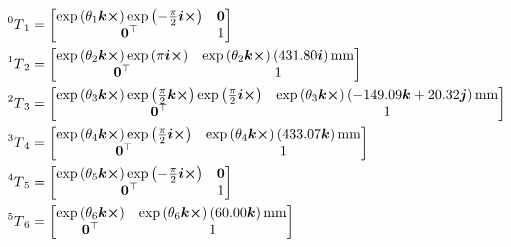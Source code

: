 \documentclass[a4paper]{scrartcl}
\begin{document}
\begin{equation}\label{eq:5transf}
     \begin{aligned}
        \prescript{0}{}{T}_1 &= \begin{bmatrix}
            \exp\left(\theta_1 \bm{k}\cross\right)\exp\left(-\tfrac{\pi}{2}\bm{i}\cross\right) & \bm{0} \\ \bm{0}^\top & 1
        \end{bmatrix} \\
        \prescript{1}{}{T}_2 &= \begin{bmatrix}
            \exp\left(\theta_2 \bm{k}\cross\right)\exp\left(\pi\bm{i}\cross\right) & \exp\left(\theta_2 \bm{k}\cross\right)\left(431.80 \bm{i} \right)\si{\mm} \\ \bm{0}^\top & 1
        \end{bmatrix}\\
        \prescript{2}{}{T}_3 &= \begin{bmatrix}
             \exp\left(\theta_3 \bm{k}\cross\right) \exp\left(\tfrac{\pi}{2}\bm{k}\cross\right)\exp\left(\tfrac{\pi}{2}\bm{i}\cross\right) & \exp\left(\theta_3 \bm{k}\cross\right) \left(-149.09 \bm{k} + 20.32 \bm{j} \right)\si{\mm} \\ \bm{0}^\top & 1
        \end{bmatrix}\\
        \prescript{3}{}{T}_4 &= \begin{bmatrix}
             \exp\left(\theta_4 \bm{k}\cross\right) \exp\left(\tfrac{\pi}{2}\bm{i}\cross\right) & \exp\left(\theta_4 \bm{k}\cross\right) \left(433.07 \bm{k} \right)\si{\mm} \\ \bm{0}^\top & 1
        \end{bmatrix}\\
        \prescript{4}{}{T}_5 &= \begin{bmatrix}
            \exp\left(\theta_5 \bm{k}\cross\right) \exp\left(-\tfrac{\pi}{2}\bm{i}\cross\right) & \bm{0} \\ \bm{0}^\top & 1
        \end{bmatrix} \\
        \prescript{5}{}{T}_6 &= \begin{bmatrix}
            \exp\left(\theta_6 \bm{k}\cross\right) & \exp\left(\theta_6 \bm{k}\cross\right) \left(60.00 \bm{k} \right)\si{\mm} \\ \bm{0}^\top & 1
        \end{bmatrix}
     \end{aligned}
 \end{equation} 
\end{document}
